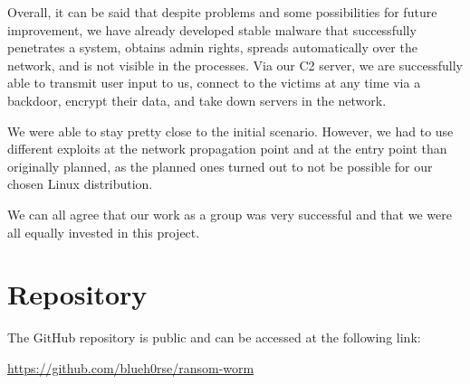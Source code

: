 Overall, it can be said that despite problems and some possibilities for future improvement, we have already developed stable malware that successfully penetrates a system, obtains admin rights, spreads automatically over the network, and is not visible in the processes. Via our C2 server, we are successfully able to transmit user input to us, connect to the victims at any time via a backdoor, encrypt their data, and take down servers in the network.

We were able to stay pretty close to the initial scenario. However, we had to use different exploits at the network propagation point and at the entry point than originally planned, as the planned ones turned out to not be possible for our chosen Linux distribution.

We can all agree that our work as a group was very successful and that we were all equally invested in this project.

\section{Repository}
\label{sec:repository}

The GitHub repository is public and can be accessed at the following link:

\url{https://github.com/blueh0rse/ransom-worm}